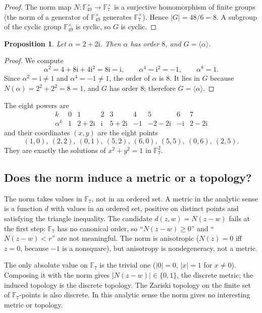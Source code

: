 \documentclass[11pt]{article}
\newtheorem{proposition}[theorem]{Proposition}
\theoremstyle{definition}
\theoremstyle{remark}
\newcommand{\F}{\mathbb{F}}
\newcommand{\ii}{\mathrm{i}}
\newcommand{\Norm}{N}
\begin{document}
\begin{proof}
The norm map $\Norm:\F_{49}^\times\to\F_7^\times$ is a surjective homomorphism
of finite groups (the norm of a generator of $\F_{49}^\times$ generates
$\F_7^\times$).  Hence $|G|=48/6=8$.  A subgroup of the cyclic group
$\F_{49}^\times$ is cyclic, so $G$ is cyclic.
\end{proof}

\begin{proposition}\label{prop:alpha}
Let $\alpha=2+2\ii$.  Then $\alpha$ has order $8$, and $G=\langle\alpha\rangle$.
\end{proposition}

\begin{proof}
We compute
\[
  \alpha^2=4+8\ii+4\ii^2=8\ii=\ii,\qquad
  \alpha^4=\ii^2=-1,\qquad
  \alpha^8=1 .
\]
Since $\alpha^2=\ii\ne1$ and $\alpha^4=-1\ne1$, the order of $\alpha$ is $8$.
It lies in $G$ because $\Norm(\alpha)=2^2+2^2=8=1$, and $G$ has order $8$;
therefore $G=\langle\alpha\rangle$.
\end{proof}

The eight powers are
\[
\begin{array}{c|cccccccc}
k & 0 & 1 & 2 & 3 & 4 & 5 & 6 & 7\\ \hline
\alpha^k & 1 & 2+2\ii & \ii & 5+2\ii & -1 & -2-2\ii & -\ii & 2-2\ii
\end{array}
\]
and their coordinates $(x,y)$ are the eight points
\[
  (1,0),\ (2,2),\ (0,1),\ (5,2),\ (6,0),\ (5,5),\ (0,6),\ (2,5).
\]
They are exactly the solutions of $x^2+y^2=1$ in $\F_7^2$.

\subsection{Does the norm induce a metric or a topology?}
\label{subsec:norm-metric}

The norm takes values in $\F_7$, not in an ordered set.  A metric in the
analytic sense is a function $d$ with values in an ordered set, positive on
distinct points and satisfying the triangle inequality.  The candidate
$d(z,w)=\Norm(z-w)$ fails at the first step: $\F_7$ has no canonical order, so
``$\Norm(z-w)\ge0$'' and ``$\Norm(z-w)<r$'' are not meaningful.  The norm is
anisotropic ($\Norm(z)=0$ iff $z=0$, because $-1$ is a nonsquare), but
anisotropy is nondegeneracy, not a metric.

The only absolute value on $\F_7$ is the trivial one ($|0|=0$, $|x|=1$ for
$x\ne0$).  Composing it with the norm gives $|\Norm(z-w)|\in\{0,1\}$, the
discrete metric; the induced topology is the discrete topology.  The Zariski
topology on the finite set of $\F_7$-points is also discrete.  In this analytic
sense the norm gives no interesting metric or topology.
\end{document}
